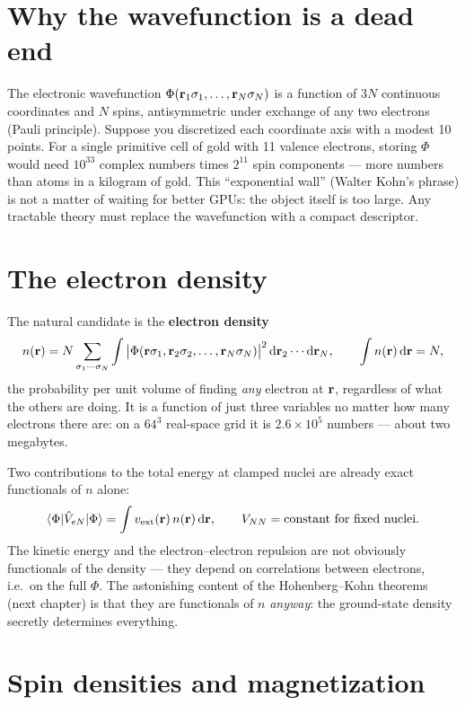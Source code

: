 \section{Why the wavefunction is a dead end}

The electronic wavefunction $\Phi(\mathbf{r}_1\sigma_1,\dots,\mathbf{r}_N\sigma_N)$ is a
function of $3N$ continuous coordinates and $N$ spins, antisymmetric under
exchange of any two electrons (Pauli principle). Suppose you discretized
each coordinate axis with a modest 10 points. For a single primitive cell of
gold with 11 valence electrons, storing $\Phi$ would need $10^{33}$ complex
numbers times $2^{11}$ spin components --- more numbers than atoms in a
kilogram of gold. This ``exponential wall'' (Walter Kohn's phrase) is not
a matter of waiting for better GPUs: the
object itself is too large. Any tractable theory must replace the
wavefunction with a compact descriptor.

\section{The electron density}

The natural candidate is the \textbf{electron density}
\begin{equation}
n(\mathbf{r}) = N \sum_{\sigma_1\cdots\sigma_N}\int
\big|\Phi(\mathbf{r}\sigma_1, \mathbf{r}_2\sigma_2, \dots, \mathbf{r}_N\sigma_N)\big|^2\,
\mathrm{d}\mathbf{r}_2 \cdots \mathrm{d}\mathbf{r}_N ,
\qquad \int n(\mathbf{r})\,\mathrm{d}\mathbf{r} = N,
\label{eq:densitydef}
\end{equation}
the probability per unit volume of finding \emph{any} electron at $\mathbf{r}$,
regardless of what the others are doing. It is a function of just three
variables no matter how many electrons there are: on a $64^3$ real-space
grid it is $2.6\times 10^5$ numbers --- about two megabytes.

Two contributions to the total energy at clamped nuclei are already exact
functionals of $n$ alone:
\begin{equation}
\braket{\Phi|\hat V_{eN}|\Phi} = \int v_{\mathrm{ext}}(\mathbf{r})\, n(\mathbf{r})\, \mathrm{d}\mathbf{r},
\qquad
V_{NN} = \text{constant for fixed nuclei}.
\end{equation}
The kinetic energy and the electron--electron repulsion are not obviously
functionals of the density --- they depend on correlations between electrons,
i.e.\ on the full $\Phi$. The astonishing content of the Hohenberg--Kohn
theorems (next chapter) is that they are functionals of $n$ \emph{anyway}:
the ground-state density secretly determines everything.

\section{Spin densities and magnetization}

